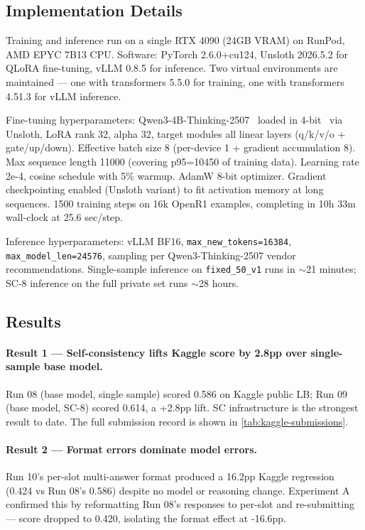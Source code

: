 \documentclass{article}
\begin{document}
\subsection{Implementation Details}
\label{sec:implementation_details}

Training and inference run on a single RTX 4090 (24GB VRAM) on RunPod, AMD EPYC 7B13 CPU. Software: PyTorch 2.6.0+cu124, Unsloth 2026.5.2 for QLoRA fine-tuning, vLLM 0.8.5 for inference. Two virtual environments are maintained --- one with transformers 5.5.0 for training, one with transformers 4.51.3 for vLLM inference.

Fine-tuning hyperparameters: Qwen3-4B-Thinking-2507~\citep{qwen3report} loaded in 4-bit~\citep{dettmers2023qlora} via Unsloth, LoRA rank 32, alpha 32, target modules all linear layers (q/k/v/o + gate/up/down). Effective batch size 8 (per-device 1 + gradient accumulation 8). Max sequence length 11000 (covering p95=10450 of training data). Learning rate 2e-4, cosine schedule with 5\% warmup. AdamW 8-bit optimizer. Gradient checkpointing enabled (Unsloth variant) to fit activation memory at long sequences. 1500 training steps on 16k OpenR1 examples, completing in 10h 33m wall-clock at 25.6 sec/step.

Inference hyperparameters: vLLM BF16, \texttt{max\_new\_tokens=16384}, \texttt{max\_model\_len=24576}, sampling per Qwen3-Thinking-2507 vendor recommendations. Single-sample inference on \texttt{fixed\_50\_v1} runs in $\sim$21 minutes; SC-8 inference on the full private set runs $\sim$28 hours.

\subsection{Results}
\label{sec:results}

\paragraph{Result 1 --- Self-consistency lifts Kaggle score by 2.8pp over single-sample base model.} Run 08 (base model, single sample) scored 0.586 on Kaggle public LB; Run 09 (base model, SC-8) scored 0.614, a +2.8pp lift. SC infrastructure is the strongest result to date. The full submission record is shown in \cref{tab:kaggle-submissions}.

\paragraph{Result 2 --- Format errors dominate model errors.} Run 10's per-slot multi-answer format produced a 16.2pp Kaggle regression (0.424 vs Run 08's 0.586) despite no model or reasoning change. Experiment A confirmed this by reformatting Run 08's responses to per-slot and re-submitting --- score dropped to 0.420, isolating the format effect at -16.6pp.
\end{document}
